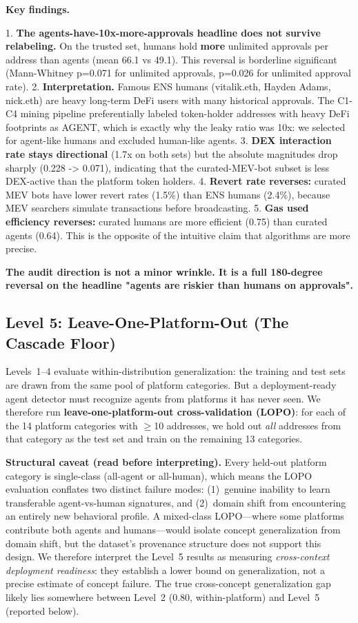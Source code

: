 \documentclass[sigconf,nonacm=false]{acmart}
\begin{document}
\textbf{Key findings.}

1. \textbf{The agents-have-10x-more-approvals headline does not survive relabeling.} On the trusted set, humans hold \textbf{more} unlimited approvals per address than agents (mean 66.1 vs 49.1). This reversal is borderline significant (Mann-Whitney p=0.071 for unlimited approvals, p=0.026 for unlimited approval rate).
2. \textbf{Interpretation.} Famous ENS humans (vitalik.eth, Hayden Adams, nick.eth) are heavy long-term DeFi users with many historical approvals. The C1-C4 mining pipeline preferentially labeled token-holder addresses with heavy DeFi footprints as AGENT, which is exactly why the leaky ratio was 10x: we selected for agent-like humans and excluded human-like agents.
3. \textbf{DEX interaction rate stays directional} (1.7x on both sets) but the absolute magnitudes drop sharply (0.228 -> 0.071), indicating that the curated-MEV-bot subset is less DEX-active than the platform token holders.
4. \textbf{Revert rate reverses:} curated MEV bots have lower revert rates (1.5\%) than ENS humans (2.4\%), because MEV searchers simulate transactions before broadcasting.
5. \textbf{Gas used efficiency reverses:} curated humans are more efficient (0.75) than curated agents (0.64). This is the opposite of the intuitive claim that algorithms are more precise.

\textbf{The audit direction is not a minor wrinkle. It is a full 180-degree reversal on the headline "agents are riskier than humans on approvals".}

\subsection{Level 5: Leave-One-Platform-Out (The Cascade Floor)}

Levels~1--4 evaluate within-distribution generalization: the training and test sets are drawn from the same pool of platform categories. But a deployment-ready agent detector must recognize agents from platforms it has never seen. We therefore run \textbf{leave-one-platform-out cross-validation (LOPO)}: for each of the 14 platform categories with $\geq$10 addresses, we hold out \emph{all} addresses from that category as the test set and train on the remaining 13 categories.

\textbf{Structural caveat (read before interpreting).} Every held-out platform category is single-class (all-agent or all-human), which means the LOPO evaluation conflates two distinct failure modes: (1)~genuine inability to learn transferable agent-vs-human signatures, and (2)~domain shift from encountering an entirely new behavioral profile. A mixed-class LOPO---where some platforms contribute both agents and humans---would isolate concept generalization from domain shift, but the dataset's provenance structure does not support this design. We therefore interpret the Level~5 results as measuring \emph{cross-context deployment readiness}: they establish a lower bound on generalization, not a precise estimate of concept failure. The true cross-concept generalization gap likely lies somewhere between Level~2 (0.80, within-platform) and Level~5 (reported below).
\end{document}
